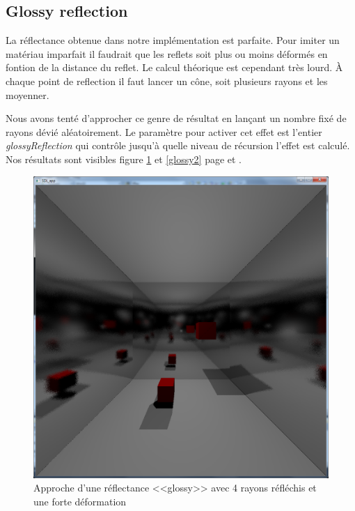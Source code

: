 \documentclass{article}
\begin{document}
\subsection{Glossy reflection}
La réflectance obtenue dans notre implémentation est parfaite. Pour imiter un matériau imparfait il faudrait que les
reflets soit plus ou moins déformés en fontion de la distance du reflet. Le calcul théorique est cependant très lourd. 
À chaque point de reflection il faut lancer un cône, soit plusieurs rayons et les moyenner.

Nous avons tenté d'approcher ce genre de résultat en lançant un nombre fixé de rayons dévié aléatoirement. Le paramètre pour
activer cet effet est l'entier \textit{glossyReflection} qui contrôle jusqu'à quelle niveau de récursion l'effet est
calculé. Nos résultats sont visibles figure \ref{glossy1} et \ref{glossy2} page \pageref{glossy1} et \pageref{glossy2}. 
\begin{figure}[!ht]
    \center
    \includegraphics[width=1.00\textwidth]{img/p5mc.png}
    \caption{Approche d'une réflectance <<glossy>> avec 4 rayons réfléchis et une forte déformation}
    \label{glossy1}
\end{figure}
\end{document}
